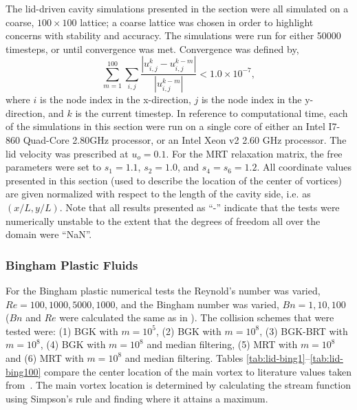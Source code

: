 \documentclass[pdftex,ms]{pittetd}
\begin{document}
The lid-driven cavity simulations presented in the section were all simulated on a coarse, $100 \times 100$ lattice; a coarse lattice was chosen in order to highlight concerns with stability and accuracy.
The simulations were run for either 50000 timesteps, or until convergence was met.
Convergence was defined by,
\begin{equation} \label{eq:convergence}
\sum_{m=1}^{100} \sum_{i, j} \frac{|u_{i, j}^k - u_{i, j}^{k-m}|}{|u_{i, j}^{k-m}|} < 1.0 \times 10^{-7},
\end{equation}
\noindent where $i$ is the node index in the x-direction, $j$ is the node index in the y-direction, and $k$ is the current timestep.
In reference to computational time, each of the simulations in this section were run on a single core of either an Intel I7-860 Quad-Core 2.80GHz processor, or an Intel Xeon v2 2.60 GHz processor.
The lid velocity was prescribed at $u_o = 0.1$.
For the MRT relaxation matrix, the free parameters were set to $s_1 = 1.1$, $s_2 = 1.0$, and $s_4 = s_6 = 1.2$.
All coordinate values presented in this section (used to describe the location of the center of vortices) are given normalized with respect to the length of the cavity side, i.e. as $(x / L, y / L)$.
Note that all results presented as ``-'' indicate that the tests were numerically unstable to the extent that the degrees of freedom all over the domain were ``NaN''.

\subsubsection{Bingham Plastic Fluids}

For the Bingham plastic numerical tests the Reynold's number was varied, $Re = 100, 1000, 5000, 1000$, and the Bingham number was varied, $Bn = 1, 10, 100$ ($Bn$ and $Re$ were calculated the same as in ).
The collision schemes that were tested were: (1) BGK with $m = 10^5$, (2) BGK with $m = 10^8$, (3) BGK-BRT with $m = 10^8$, (4) BGK with $m = 10^8$ and median filtering, (5) MRT with $m = 10^8$ and (6) MRT with $m = 10^8$ and median filtering.
Tables \ref{tab:lid-bing1}--\ref{tab:lid-bing100} compare the center location of the main vortex to literature values taken from~\citet{syrakos2014performance}.
The main vortex location is determined by calculating the stream function using Simpson's rule and finding where it attains a maximum.
\end{document}
